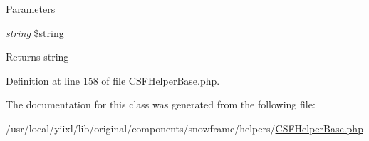 \begin{DoxyParams}{Parameters}
\item[{\em string}]\$string \end{DoxyParams}
\begin{DoxyReturn}{Returns}
string 
\end{DoxyReturn}


Definition at line 158 of file CSFHelperBase.php.








The documentation for this class was generated from the following file:\begin{DoxyCompactItemize}
\item 
/usr/local/yiixl/lib/original/components/snowframe/helpers/\hyperlink{CSFHelperBase_8php}{CSFHelperBase.php}\end{DoxyCompactItemize}
